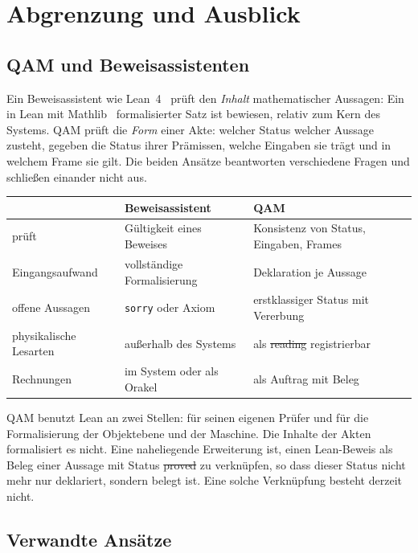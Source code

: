 \section{Abgrenzung und Ausblick}\label{sec:abgrenzung}

\subsection{QAM und Beweisassistenten}

Ein Beweisassistent wie Lean~4~\cite{lean4} prüft den \emph{Inhalt} mathematischer Aussagen: Ein in Lean mit Mathlib~\cite{mathlib}
formalisierter Satz ist bewiesen, relativ zum Kern des Systems. QAM prüft die \emph{Form} einer Akte: welcher Status welcher Aussage zusteht,
gegeben die Status ihrer Prämissen, welche Eingaben sie trägt und in welchem Frame sie gilt. Die beiden Ansätze beantworten verschiedene
Fragen und schließen einander nicht aus.
\begin{center}
\small
\begin{tabular}{@{}p{}p{}p{}@{}}
\toprule
 & Beweisassistent & QAM\\
\midrule
prüft & Gültigkeit eines Beweises & Konsistenz von Status, Eingaben, Frames\\
Eingangsaufwand & vollständige Formalisierung & Deklaration je Aussage\\
offene Aussagen & \texttt{sorry} oder Axiom & erstklassiger Status mit Vererbung\\
physikalische Lesarten & außerhalb des Systems & als \st{reading} registrierbar\\
Rechnungen & im System oder als Orakel & als Auftrag mit Beleg\\
\bottomrule
\end{tabular}
\end{center}
QAM benutzt Lean an zwei Stellen: für seinen eigenen Prüfer und für die Formalisierung der Objektebene und der Maschine. Die Inhalte der
Akten formalisiert es nicht. Eine naheliegende Erweiterung ist, einen Lean-Beweis als Beleg einer Aussage mit Status \st{proved} zu
verknüpfen, so dass dieser Status nicht mehr nur deklariert, sondern belegt ist. Eine solche Verknüpfung besteht derzeit nicht.

\subsection{Verwandte Ansätze}

